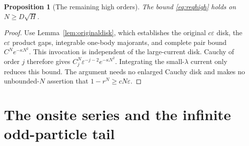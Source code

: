 \documentclass[11pt]{article}
\numberwithin{equation}{section}
\newtheorem{proposition}[theorem]{Proposition}
\theoremstyle{definition}
\newcommand{\eps}{\varepsilon}
\begin{document}
\begin{proposition}[The remaining high orders]\label{prop:highKS}
The bound \eqref{eq:reqhigh} holds on
\(N\ge D\sqrt H\).
\end{proposition}
\begin{proof}
Use Lemma~\ref{lem:originaldisk}, which establishes the original
\(c\eps\) disk, the \(c\eps\) product gaps, integrable one-body
majorants, and complete pair bound \(C^Ne^{-\kappa N^2}\).
This invocation is independent of the large-current disk.
Cauchy of order \(j\) therefore gives
\(C_j^N\eps^{-j-2}e^{-\kappa N^2}\).
Integrating the small-\(\lambda\) current only reduces this bound.
The argument needs no enlarged Cauchy disk and makes no
unbounded-\(N\) assertion that \(1-r^N\ge cN\eps\).
\end{proof}




\section{The onsite series and the infinite odd-particle tail}\label{sec:conclusion}
\end{document}
